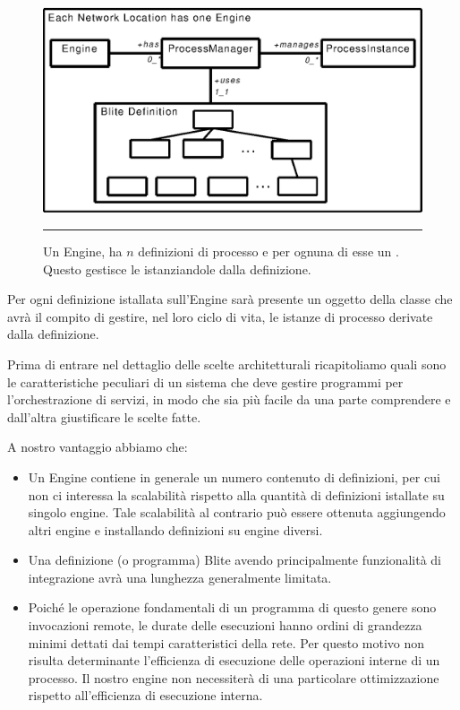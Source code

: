 \begin{figure}[th]
\begin{center}
  \includegraphics{architettura_interna/dia/engine}
  \caption[Blite-se: Engine, ProcessManager e ProcessInstace]{
  	Un Engine, ha $n$ definizioni di processo e per ognuna di esse un
  	. Questo gestisce le 
  	istanziandole dalla definizione.}
   \rule{7cm}{0.01cm}
  \label{fig:1}
\end{center}
\end{figure}

Per ogni definizione istallata sull'Engine sarà presente un oggetto 
della classe  che avrà il compito di gestire, nel loro
ciclo di vita, le istanze di processo derivate dalla definizione.

Prima di entrare nel dettaglio delle scelte architetturali ricapitoliamo quali
sono le caratteristiche peculiari di un sistema che deve gestire programmi per
l'orchestrazione di servizi, in modo che sia pi\`u facile da una parte
comprendere e dall'altra giustificare le scelte fatte.

A nostro vantaggio abbiamo che: \nopagebreak
\begin{itemize}
  \item Un Engine contiene in generale un numero contenuto di definizioni, per
  cui non ci interessa la scalabilità rispetto alla quantità di definizioni
  istallate su singolo engine. Tale scalabilità al contrario può essere
  ottenuta aggiungendo altri engine e installando definizioni su engine diversi.
  
  \item  Una definizione (o programma) Blite avendo principalmente funzionalità
  di integrazione avrà una lunghezza generalmente limitata. 
  
  \item Poiché le operazione fondamentali di un programma di questo genere
  sono invocazioni remote, le durate delle esecuzioni hanno ordini di grandezza
  minimi dettati dai tempi caratteristici della rete. Per questo motivo non
  risulta determinante l'efficienza di esecuzione delle operazioni interne di un
  processo. Il nostro engine non necessiterà di una particolare ottimizzazione 
  rispetto all'efficienza di esecuzione interna.
\end{itemize}

